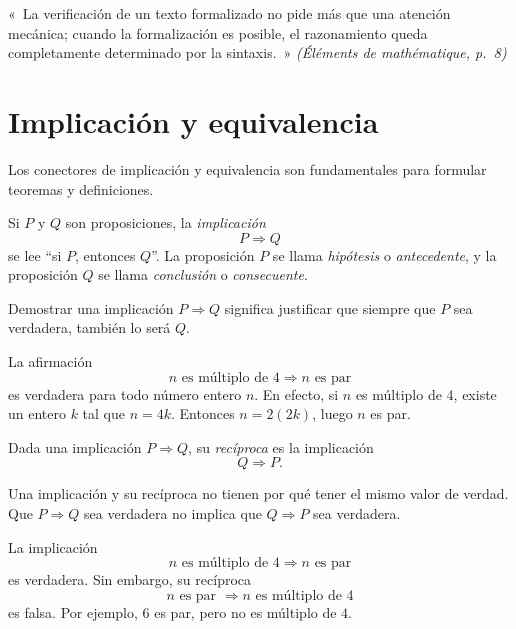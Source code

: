 \begin{cita}
  « La verificación de un texto formalizado no pide más que una
  atención mecánica; cuando la formalización es posible, el
  razonamiento queda completamente determinado por la sintaxis. »
  \hfill \textit{(Éléments de mathématique, p.~8)}
\end{cita}

\section{Implicación y equivalencia}
\label{sec:implicacion-equivalencia}

Los conectores de implicación y equivalencia son fundamentales para formular teoremas y definiciones.

\begin{definicion}[Implicación]
Si $P$ y $Q$ son proposiciones, la \emph{implicación}
\[
  P\Rightarrow Q
\]
se lee ``si $P$, entonces $Q$''. La proposición $P$ se llama \emph{hipótesis} o \emph{antecedente}, y la proposición $Q$ se llama \emph{conclusión} o \emph{consecuente}.
\end{definicion}

Demostrar una implicación $P\Rightarrow Q$ significa justificar que siempre que $P$ sea verdadera, también lo será $Q$.

\begin{ejemplo}
La afirmación
\[
  n \text{ es múltiplo de }4 \Rightarrow n \text{ es par}
\]
es verdadera para todo número entero $n$. En efecto, si $n$ es múltiplo de $4$, existe un entero $k$ tal que $n=4k$. Entonces $n=2(2k)$, luego $n$ es par.
\end{ejemplo}

\begin{definicion}[Recíproca]
Dada una implicación $P\Rightarrow Q$, su \emph{recíproca} es la implicación
\[
  Q\Rightarrow P.
\]
\end{definicion}

\begin{advertencia}
Una implicación y su recíproca no tienen por qué tener el mismo valor de verdad. Que $P\Rightarrow Q$ sea verdadera no implica que $Q\Rightarrow P$ sea verdadera.
\end{advertencia}

\begin{ejemplo}
La implicación
\[
  n \text{ es múltiplo de }4 \Rightarrow n \text{ es par}
\]
es verdadera. Sin embargo, su recíproca
\[
  n \text{ es par } \Rightarrow n \text{ es múltiplo de }4
\]
es falsa. Por ejemplo, $6$ es par, pero no es múltiplo de $4$.
\end{ejemplo}

